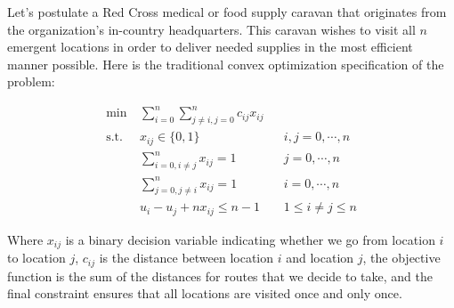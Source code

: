 \documentclass[a0,final]{a0poster}
\begin{document}
\begin{multicols}{3}
Let's postulate a Red Cross medical or food supply caravan that originates from the organization's in-country headquarters. This caravan wishes to visit all $n$ emergent locations in order to deliver needed supplies in the most efficient manner possible. Here is the traditional convex optimization specification of the problem:\cite{Winston}

\vspace{-10mm}

\begin{align*}
\min &\sum_{i=0}^n \sum_{j\ne i,j=0}^nc_{ij}x_{ij} &&  \\
\mathrm{s.t.} \; \; & x_{ij} \in \{0, 1\} && i,j=0, \cdots, n \\
	& \sum_{i=0,i\ne j}^n x_{ij} = 1 && j=0, \cdots, n \\
	& \sum_{j=0,j\ne i}^n x_{ij} = 1 && i=0, \cdots, n \\
	&u_i-u_j +nx_{ij} \le n-1 && 1 \le i \ne j \le n
\end{align*}

\noindent Where $x_{ij}$ is a binary decision variable indicating whether we go from location $i$ to location $j$, $c_{ij}$ is the distance between location $i$ and location $j$, the objective function is the sum of the distances for routes that we decide to take, and the final constraint ensures that all locations are visited once and only once.



\end{multicols}
\end{document}
